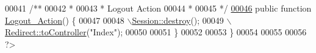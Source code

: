 \begin{DoxyCode}
00041 \textcolor{comment}{        /**}
00042 \textcolor{comment}{         * }
00043 \textcolor{comment}{         * Logout Action}
00044 \textcolor{comment}{         * }
00045 \textcolor{comment}{         */}
\hypertarget{_user_session_8php_source_l00046}{}\hyperlink{class_controller_1_1_user_session_a2078537fe028f203be44fdfe2b3c0036}{00046}         \textcolor{keyword}{public} \textcolor{keyword}{function} \hyperlink{class_controller_1_1_user_session_a2078537fe028f203be44fdfe2b3c0036}{Logout\_Action}() \{
00047 
00048                 \hyperlink{class_session_a5dde74b6fa44649e5b73cb1096930dd4}{\(\backslash\)Session::destroy}();
00049                 \hyperlink{class_redirect_a5a8f456a5318387c966b24c0cbe2c083}{\(\backslash\)Redirect::toController}(\textcolor{stringliteral}{"Index"});
00050                 
00051         \}
00052                 
00053 \}
00054 
00055 
00056 ?>
\end{DoxyCode}
